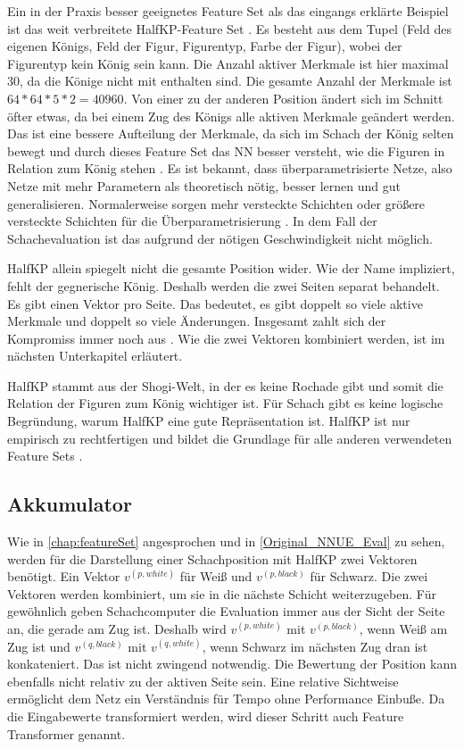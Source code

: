 Ein in der Praxis besser geeignetes Feature Set als das eingangs erklärte Beispiel ist das weit verbreitete HalfKP-Feature Set \cite{YNasu2018,StockfishNNUE}. Es besteht aus dem Tupel (Feld des eigenen Königs, Feld der Figur, Figurentyp, Farbe der Figur), wobei der Figurentyp kein König sein kann. Die Anzahl aktiver Merkmale ist hier maximal 30, da die Könige nicht mit enthalten sind. Die gesamte Anzahl der Merkmale ist $64*64*5*2=40960$. Von einer zu der anderen Position ändert sich im Schnitt öfter etwas, da bei einem Zug des Königs alle aktiven Merkmale geändert werden. Das ist eine bessere Aufteilung der Merkmale, da sich im Schach der König selten bewegt und durch dieses Feature Set das \ac{NN} besser versteht, wie die Figuren in Relation zum König stehen \cite{StockfishNNUE}. Es ist bekannt, dass überparametrisierte Netze, also Netze mit mehr Parametern als theoretisch nötig, besser lernen und gut generalisieren. Normalerweise sorgen mehr versteckte Schichten oder größere versteckte Schichten für die Überparametrisierung \cite{Du2018, allen2019learning}. In dem Fall der Schachevaluation ist das aufgrund der nötigen Geschwindigkeit nicht möglich.

HalfKP allein spiegelt nicht die gesamte Position wider. Wie der Name impliziert, fehlt der gegnerische König. Deshalb werden die zwei Seiten separat behandelt. Es gibt einen Vektor pro Seite. Das bedeutet, es gibt doppelt so viele aktive Merkmale und doppelt so viele Änderungen. Insgesamt zahlt sich der Kompromiss immer noch aus \cite{StockfishNNUE}. Wie die zwei Vektoren kombiniert werden, ist im nächsten Unterkapitel erläutert.

HalfKP stammt aus der Shogi-Welt, in der es keine Rochade gibt und somit die Relation der Figuren zum König wichtiger ist. Für Schach gibt es keine logische Begründung, warum HalfKP eine gute Repräsentation ist. HalfKP ist nur empirisch zu rechtfertigen und bildet die Grundlage für alle anderen verwendeten Feature Sets \cite{StockfishNNUE}.

\subsection{Akkumulator}
\label{chap:accumulator}

Wie in \autoref{chap:featureSet} angesprochen und in \autoref{Original_NNUE_Eval} zu sehen, werden für die Darstellung einer Schachposition mit HalfKP zwei Vektoren benötigt. Ein Vektor $v^{(p,white)}$ für Weiß und $v^{(p,black)}$ für Schwarz. Die zwei Vektoren werden kombiniert, um sie in die nächste Schicht weiterzugeben. Für gewöhnlich geben Schachcomputer die Evaluation immer aus der Sicht der Seite an, die gerade am Zug ist. Deshalb wird $v^{(p,white)}$ mit $v^{(p,black)}$, wenn Weiß am Zug ist und $v^{(q,black)}$ mit $v^{(q,white)}$, wenn Schwarz im nächsten Zug dran ist konkateniert. Das ist nicht zwingend notwendig. Die Bewertung der Position kann ebenfalls nicht relativ zu der aktiven Seite sein. Eine relative Sichtweise ermöglicht dem Netz ein Verständnis für Tempo ohne Performance Einbuße. Da die Eingabewerte transformiert werden, wird dieser Schritt auch Feature Transformer genannt.

